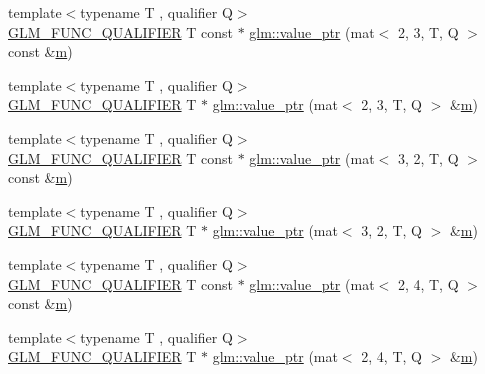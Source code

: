 \begin{DoxyCompactItemize}
\item 
{\footnotesize template$<$typename T , qualifier Q$>$ }\\\hyperlink{setup_8hpp_a33fdea6f91c5f834105f7415e2a64407}{G\+L\+M\+\_\+\+F\+U\+N\+C\+\_\+\+Q\+U\+A\+L\+I\+F\+I\+ER} T const  $\ast$ \hyperlink{group__gtc__type__ptr_ga2be1ab45c7a864986baac31557910adb}{glm\+::value\+\_\+ptr} (mat$<$ 2, 3, T, Q $>$ const \&\hyperlink{_s_d_l__opengl__glext_8h_af593500c283bf1a787a6f947f503a5c2}{m})
\item 
{\footnotesize template$<$typename T , qualifier Q$>$ }\\\hyperlink{setup_8hpp_a33fdea6f91c5f834105f7415e2a64407}{G\+L\+M\+\_\+\+F\+U\+N\+C\+\_\+\+Q\+U\+A\+L\+I\+F\+I\+ER} T $\ast$ \hyperlink{group__gtc__type__ptr_gab420b07b29bb3bb1cec07b6c31725fef}{glm\+::value\+\_\+ptr} (mat$<$ 2, 3, T, Q $>$ \&\hyperlink{_s_d_l__opengl__glext_8h_af593500c283bf1a787a6f947f503a5c2}{m})
\item 
{\footnotesize template$<$typename T , qualifier Q$>$ }\\\hyperlink{setup_8hpp_a33fdea6f91c5f834105f7415e2a64407}{G\+L\+M\+\_\+\+F\+U\+N\+C\+\_\+\+Q\+U\+A\+L\+I\+F\+I\+ER} T const  $\ast$ \hyperlink{group__gtc__type__ptr_ga0c9f0f561c848ec89d34977eff6a7b17}{glm\+::value\+\_\+ptr} (mat$<$ 3, 2, T, Q $>$ const \&\hyperlink{_s_d_l__opengl__glext_8h_af593500c283bf1a787a6f947f503a5c2}{m})
\item 
{\footnotesize template$<$typename T , qualifier Q$>$ }\\\hyperlink{setup_8hpp_a33fdea6f91c5f834105f7415e2a64407}{G\+L\+M\+\_\+\+F\+U\+N\+C\+\_\+\+Q\+U\+A\+L\+I\+F\+I\+ER} T $\ast$ \hyperlink{group__gtc__type__ptr_gacd2f2c950912a073f6f77494df9e42a6}{glm\+::value\+\_\+ptr} (mat$<$ 3, 2, T, Q $>$ \&\hyperlink{_s_d_l__opengl__glext_8h_af593500c283bf1a787a6f947f503a5c2}{m})
\item 
{\footnotesize template$<$typename T , qualifier Q$>$ }\\\hyperlink{setup_8hpp_a33fdea6f91c5f834105f7415e2a64407}{G\+L\+M\+\_\+\+F\+U\+N\+C\+\_\+\+Q\+U\+A\+L\+I\+F\+I\+ER} T const  $\ast$ \hyperlink{group__gtc__type__ptr_ga81f821818736c8cb80a899cf5819aac9}{glm\+::value\+\_\+ptr} (mat$<$ 2, 4, T, Q $>$ const \&\hyperlink{_s_d_l__opengl__glext_8h_af593500c283bf1a787a6f947f503a5c2}{m})
\item 
{\footnotesize template$<$typename T , qualifier Q$>$ }\\\hyperlink{setup_8hpp_a33fdea6f91c5f834105f7415e2a64407}{G\+L\+M\+\_\+\+F\+U\+N\+C\+\_\+\+Q\+U\+A\+L\+I\+F\+I\+ER} T $\ast$ \hyperlink{group__gtc__type__ptr_ga4c03b3900c5a82d8915b0c8c6d5dce4e}{glm\+::value\+\_\+ptr} (mat$<$ 2, 4, T, Q $>$ \&\hyperlink{_s_d_l__opengl__glext_8h_af593500c283bf1a787a6f947f503a5c2}{m})

\end{DoxyCompactItemize}

